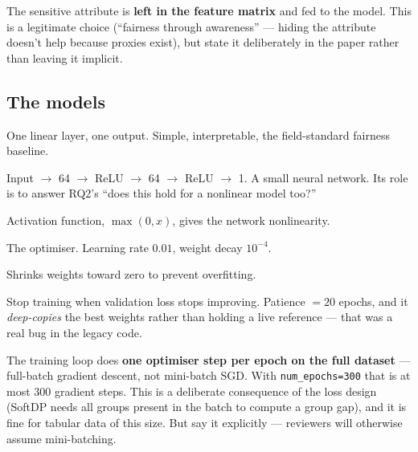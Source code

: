 \documentclass[11pt,a4paper]{article}
\newcommand{\code}[1]{\texttt{\small #1}}
\begin{document}
\begin{warnbox}
The sensitive attribute is \textbf{left in the feature matrix} and fed to the
model. This is a legitimate choice (``fairness through awareness'' --- hiding
the attribute doesn't help because proxies exist), but state it deliberately in
the paper rather than leaving it implicit.
\end{warnbox}

\subsection{The models}

\begin{description}[leftmargin=0em,style=nextline,itemsep=5pt]
\item[Logistic Regression (LR)]
One linear layer, one output. Simple, interpretable, the field-standard
fairness baseline.

\item[MLP (Multi-Layer Perceptron), 64--64]
Input $\to$ 64 $\to$ ReLU $\to$ 64 $\to$ ReLU $\to$ 1. A small neural network.
Its role is to answer RQ2's ``does this hold for a nonlinear model too?''

\item[ReLU] Activation function, $\max(0,x)$, gives the network nonlinearity.

\item[Adam] The optimiser. Learning rate $0.01$, weight decay $10^{-4}$.

\item[Weight decay (L2 regularisation)]
Shrinks weights toward zero to prevent overfitting.

\item[Early stopping]
Stop training when validation loss stops improving. Patience $=20$ epochs, and
it \emph{deep-copies} the best weights rather than holding a live reference ---
that was a real bug in the legacy code.
\end{description}

\begin{warnbox}
The training loop does \textbf{one optimiser step per epoch on the full
dataset} --- full-batch gradient descent, not mini-batch SGD. With
\code{num\_epochs=300} that is at most 300 gradient steps. This is a deliberate
consequence of the loss design (SoftDP needs all groups present in the batch to
compute a group gap), and it is fine for tabular data of this size. But say it
explicitly --- reviewers will otherwise assume mini-batching.
\end{warnbox}
\end{document}
